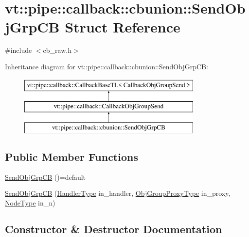 \hypertarget{structvt_1_1pipe_1_1callback_1_1cbunion_1_1_send_obj_grp_c_b}{}\section{vt\+:\+:pipe\+:\+:callback\+:\+:cbunion\+:\+:Send\+Obj\+Grp\+CB Struct Reference}
\label{structvt_1_1pipe_1_1callback_1_1cbunion_1_1_send_obj_grp_c_b}


{\ttfamily \#include $<$cb\+\_\+raw.\+h$>$}

Inheritance diagram for vt\+:\+:pipe\+:\+:callback\+:\+:cbunion\+:\+:Send\+Obj\+Grp\+CB\+:\begin{figure}[H]
\begin{center}
\leavevmode
\includegraphics[height=3.000000cm]{structvt_1_1pipe_1_1callback_1_1cbunion_1_1_send_obj_grp_c_b}
\end{center}
\end{figure}
\subsection*{Public Member Functions}
\begin{DoxyCompactItemize}
\item 
\hyperlink{structvt_1_1pipe_1_1callback_1_1cbunion_1_1_send_obj_grp_c_b_a0b68a4826c206b4873c7b0f339dc40d3}{Send\+Obj\+Grp\+CB} ()=default
\item 
\hyperlink{structvt_1_1pipe_1_1callback_1_1cbunion_1_1_send_obj_grp_c_b_acc592625e093ec290d33cf7d6e32dead}{Send\+Obj\+Grp\+CB} (\hyperlink{namespacevt_af64846b57dfcaf104da3ef6967917573}{Handler\+Type} in\+\_\+handler, \hyperlink{namespacevt_ad7cae989df485fccca57f0792a880a8e}{Obj\+Group\+Proxy\+Type} in\+\_\+proxy, \hyperlink{namespacevt_a866da9d0efc19c0a1ce79e9e492f47e2}{Node\+Type} in\+\_\+n)
\end{DoxyCompactItemize}


\subsection{Constructor \& Destructor Documentation}
\mbox{\label{structvt_1_1pipe_1_1callback_1_1cbunion_1_1_send_obj_grp_c_b_a0b68a4826c206b4873c7b0f339dc40d3}} 

